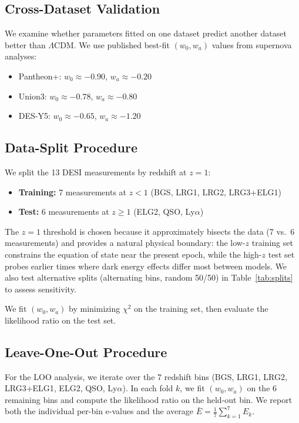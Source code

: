 \documentclass[11pt,a4paper]{article}
\newcommand{\LCDM}{$\Lambda$CDM}
\begin{document}
\subsection{Cross-Dataset Validation}

We examine whether parameters fitted on one dataset predict another dataset better than \LCDM. We use published best-fit $(w_0, w_a)$ values from supernova analyses:
\begin{itemize}
    \item Pantheon+: $w_0 \approx -0.90$, $w_a \approx -0.20$
    \item Union3: $w_0 \approx -0.78$, $w_a \approx -0.80$
    \item DES-Y5: $w_0 \approx -0.65$, $w_a \approx -1.20$
\end{itemize}

\subsection{Data-Split Procedure}

We split the 13 DESI measurements by redshift at $z = 1$:
\begin{itemize}
    \item \textbf{Training:} 7 measurements at $z < 1$ (BGS, LRG1, LRG2, LRG3+ELG1)
    \item \textbf{Test:} 6 measurements at $z \geq 1$ (ELG2, QSO, Ly$\alpha$)
\end{itemize}

The $z = 1$ threshold is chosen because it approximately bisects the data (7 vs.\ 6 measurements) and provides a natural physical boundary: the low-$z$ training set constrains the equation of state near the present epoch, while the high-$z$ test set probes earlier times where dark energy effects differ most between models. We also test alternative splits (alternating bins, random 50/50) in Table~\ref{tab:splits} to assess sensitivity.

We fit $(w_0, w_a)$ by minimizing $\chi^2$ on the training set, then evaluate the likelihood ratio on the test set.

\subsection{Leave-One-Out Procedure}

For the LOO analysis, we iterate over the 7 redshift bins (BGS, LRG1, LRG2, LRG3+ELG1, ELG2, QSO, Ly$\alpha$). In each fold $k$, we fit $(w_0, w_a)$ on the 6 remaining bins and compute the likelihood ratio on the held-out bin. We report both the individual per-bin e-values and the average $\bar{E} = \frac{1}{7}\sum_{k=1}^7 E_k$.
\end{document}

